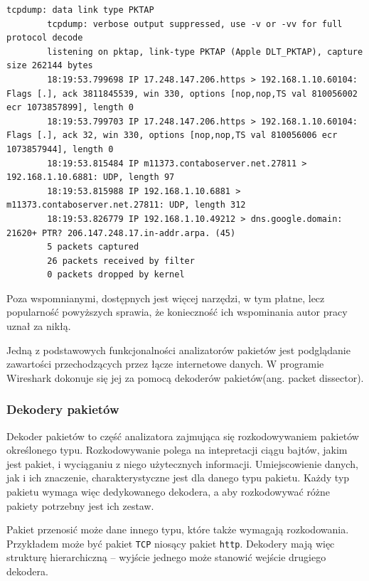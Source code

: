 \documentclass[a4paper, 12pt, twoside, openright]{article}
\begin{document}
	\begin{minipage}{\linewidth}
		\begin{lstlisting}[style=CStyle,caption={Przykładowy wynik użycia programu \texttt{tcpdump}}]
		tcpdump: data link type PKTAP
		tcpdump: verbose output suppressed, use -v or -vv for full protocol decode
		listening on pktap, link-type PKTAP (Apple DLT_PKTAP), capture size 262144 bytes
		18:19:53.799698 IP 17.248.147.206.https > 192.168.1.10.60104: Flags [.], ack 3811845539, win 330, options [nop,nop,TS val 810056002 ecr 1073857899], length 0
		18:19:53.799703 IP 17.248.147.206.https > 192.168.1.10.60104: Flags [.], ack 32, win 330, options [nop,nop,TS val 810056006 ecr 1073857944], length 0
		18:19:53.815484 IP m11373.contaboserver.net.27811 > 192.168.1.10.6881: UDP, length 97
		18:19:53.815988 IP 192.168.1.10.6881 > m11373.contaboserver.net.27811: UDP, length 312
		18:19:53.826779 IP 192.168.1.10.49212 > dns.google.domain: 21620+ PTR? 206.147.248.17.in-addr.arpa. (45)
		5 packets captured
		26 packets received by filter
		0 packets dropped by kernel \end{lstlisting}
	\end{minipage}


	Poza wspomnianymi, dostępnych jest więcej narzędzi, w tym płatne, lecz popularność powyższych sprawia,
	że konieczność ich wspominania autor pracy uznał za nikłą.

	Jedną z podstawowych funkcjonalności analizatorów pakietów jest podglądanie zawartości przechodzących przez łącze internetowe danych.
	W programie Wireshark dokonuje się jej za pomocą dekoderów pakietów(ang. packet dissector).

	\newpage
	\subsubsection{Dekodery pakietów}
	\indent\par
	Dekoder pakietów to część analizatora zajmująca się rozkodowywaniem pakietów określonego typu. Rozkodowywanie polega na intepretacji
	ciągu bajtów, jakim jest pakiet, i wyciąganiu z niego użytecznych informacji. Umiejscowienie danych, jak i ich znaczenie,
	charakterystyczne jest dla danego typu pakietu. Każdy typ pakietu wymaga więc dedykowanego dekodera, a aby rozkodowywać
	różne pakiety potrzebny jest ich zestaw.

	Pakiet przenosić może dane innego typu, które także wymagają rozkodowania. Przykładem może być pakiet \texttt{TCP} niosący pakiet
	\texttt{http}. Dekodery mają więc strukturę hierarchiczną -- wyjście jednego może stanowić wejście drugiego dekodera.
\end{document}
